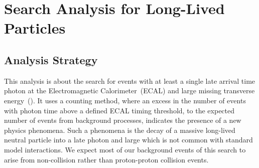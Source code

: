 \chapter{Search Analysis for Long-Lived Particles }
\section{Analysis Strategy}\label{Analysis}
This analysis is about the search for events with at least a single late arrival time photon at the Electromagnetic Calorimeter~(ECAL) and  large missing transverse energy~(\MET). It uses a counting method, where an excess in the number of events with photon time above a defined ECAL timing threshold, to the expected number of events from background processes, indicates the presence of a new physics phenomena. Such a phenomena is the decay of a massive long-lived neutral particle into a late photon and large \MET which is not common with standard model interactions. 
\newline
We expect most of our background events of this search to arise from  non-collision rather than proton-proton collision events.
